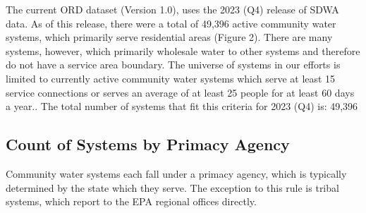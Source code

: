 \documentclass[
  letterpaper,
  DIV=11,
  numbers=noendperiod,
  oneside]{scrartcl}
\begin{document}
The current ORD dataset (Version 1.0), uses the 2023 (Q4) release of
SDWA data. As of this release, there were a total of 49,396 active
community water systems, which primarily serve residential areas (Figure
2). There are many systems, however, which primarily wholesale water to
other systems and therefore do not have a service area boundary. The
universe of systems in our efforts is limited to currently active
community water systems which serve at least 15 service connections or
serves an average of at least 25 people for at least 60 days a year..
The total number of systems that fit this criteria for 2023 (Q4) is:
49,396

\subsection{Count of Systems by Primacy
Agency}\label{count-of-systems-by-primacy-agency}

Community water systems each fall under a primacy agency, which is
typically determined by the state which they serve. The exception to
this rule is tribal systems, which report to the EPA regional offices
directly.
\end{document}
